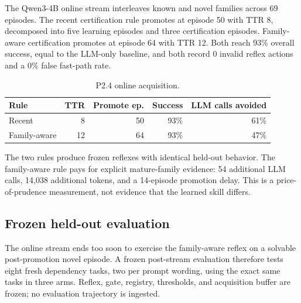 \documentclass[10pt]{article}
\begin{document}
The Qwen3-4B online stream interleaves known and novel families across 69 episodes. The recent certification rule promotes at episode 50 with TTR 8, decomposed into five learning episodes and three certification episodes. Family-aware certification promotes at episode 64 with TTR 12. Both reach 93\% overall success, equal to the LLM-only baseline, and both record 0 invalid reflex actions and a 0\% false fast-path rate.

\begin{table}[t]
\centering
\caption{P2.4 online acquisition.}
\label{tab:online}
\begin{tabular}{lrrrr}
\toprule
Rule & TTR & Promote ep. & Success & LLM calls avoided \\
\midrule
Recent & 8 & 50 & 93\% & 61\% \\
Family-aware & 12 & 64 & 93\% & 47\% \\
\bottomrule
\end{tabular}
\end{table}

The two rules produce frozen reflexes with identical held-out behavior. The family-aware rule pays for explicit mature-family evidence: 54 additional LLM calls, 14,038 additional tokens, and a 14-episode promotion delay. This is a price-of-prudence measurement, not evidence that the learned skill differs.

\subsection{Frozen held-out evaluation}

The online stream ends too soon to exercise the family-aware reflex on a solvable post-promotion novel episode. A frozen post-stream evaluation therefore tests eight fresh dependency tasks, two per prompt wording, using the exact same tasks in three arms. Reflex, gate, registry, thresholds, and acquisition buffer are frozen; no evaluation trajectory is ingested.
\end{document}
